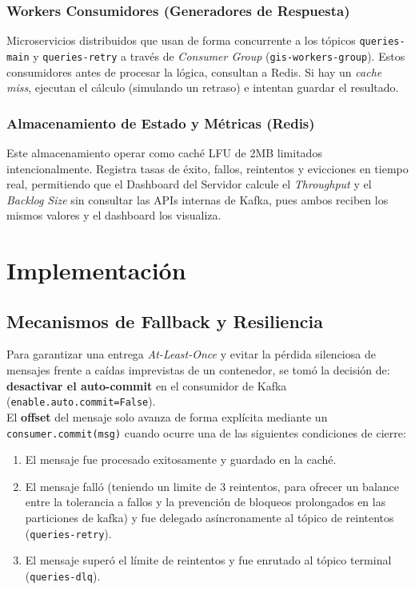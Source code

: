\documentclass[letter,12pt]{article}
\begin{document}
\subsubsection{Workers Consumidores (Generadores de Respuesta)}
Microservicios distribuidos que usan de forma concurrente a los tópicos \texttt{queries-main} y \texttt{queries-retry} a través de \textit{Consumer Group} (\texttt{gis-workers-group}). Estos consumidores antes de procesar la lógica, consultan a Redis. Si hay un \textit{cache miss}, ejecutan el cálculo (simulando un retraso) e intentan guardar el resultado.

\subsubsection{Almacenamiento de Estado y Métricas (Redis)}
Este almacenamiento operar como caché LFU de 2MB limitados intencionalmente. Registra tasas de éxito, fallos, reintentos y evicciones en tiempo real, permitiendo que el Dashboard del Servidor calcule el \textit{Throughput} y el \textit{Backlog Size} sin consultar las APIs internas de Kafka, pues ambos reciben los mismos valores y el dashboard los visualiza.

\section{Implementación}

\subsection{Mecanismos de Fallback y Resiliencia}

Para garantizar una entrega \textit{At-Least-Once} y evitar la pérdida silenciosa de mensajes frente a caídas imprevistas de un contenedor, se tomó la decisión de: \textbf{desactivar el auto-commit} en el consumidor de Kafka (\texttt{enable.auto.commit=False}).
\\
El \textbf{offset} del mensaje solo avanza de forma explícita mediante un \texttt{consumer.commit(msg)} cuando ocurre una de las siguientes condiciones de cierre:
\begin{enumerate}
    \item El mensaje fue procesado exitosamente y guardado en la caché.
    \item El mensaje falló (teniendo un limite de $3$ reintentos, para ofrecer un balance entre la tolerancia a fallos y la prevención de bloqueos prolongados en las particiones de kafka) y fue delegado asíncronamente al tópico de reintentos (\texttt{queries-retry}).
    \item El mensaje superó el límite de reintentos y fue enrutado al tópico terminal (\texttt{queries-dlq}).
\end{enumerate}
\end{document}
